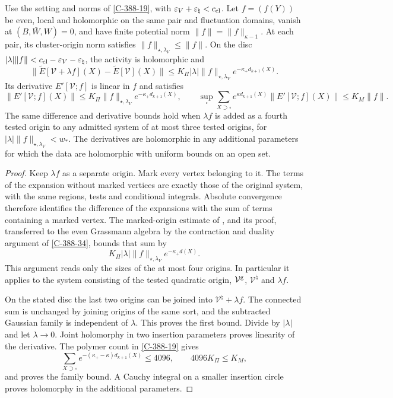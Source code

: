 \documentclass[11pt,letterpaper,reqno]{amsart}
\makeatletter
\theoremstyle{definition}
\newcommand{\ms@minorstart}{%
  \pushQED{\qed}\renewcommand{\qedsymbol}{$\blacksquare$}}
\newenvironment{lemma}[1][]{\ms@minorstart\ms@lemma[#1]}
  {\popQED\endms@lemma}
\theoremstyle{remark}
\makeatother
\begin{document}
\begin{lemma}[First variation of the expansion]\label{C-388-39}
Use the setting and norms of \cref{C-388-19}, with
$\varepsilon_V+\varepsilon_\natural<c_{\rm cl}$.
Let $f=(f(Y))$ be even, local and holomorphic on the same pair
and fluctuation domains, vanish at $(B,\bar W,W)=0$, and have
finite potential norm $\|f\|=\|f\|_{\kappa-1}$. At each pair,
its cluster-origin norm satisfies
$\|f\|_{\star,\lambda_V}\le\|f\|$. On the disc
$|\lambda|\|f\|<c_{\rm cl}-\varepsilon_V-\varepsilon_\natural$,
the activity is holomorphic and
\[
 \|\widetilde E[\mathcal V+\lambda f](X)
                   -\widetilde E[\mathcal V](X)\|
 \le K_\Pi|\lambda|\|f\|_{\star,\lambda_V}
                       e^{-\kappa_+d_{k+1}(X)}.
\]
Its derivative $E'[\mathcal V;f]$ is linear in $f$ and satisfies
\[
 \|E'[\mathcal V;f](X)\|
 \le K_\Pi\|f\|_{\star,\lambda_V}e^{-\kappa_+d_{k+1}(X)},
 \qquad
 \sup_\square\sum_{X\supset\square}e^{\kappa d_{k+1}(X)}
       \|E'[\mathcal V;f](X)\|\le K_M\|f\|.
\]
The same difference and derivative bounds hold when $\lambda f$
is added as a fourth tested origin to any admitted system of
at most three tested origins, for
$|\lambda|\|f\|_{\star,\lambda_V}<w_*$. The derivatives are
holomorphic in any additional parameters for which the data
are holomorphic with uniform bounds on an open set.
\end{lemma}
\begin{proof}
Keep $\lambda f$ as a separate origin. Mark every vertex belonging
to it. The terms of the expansion without marked vertices are
exactly those of the original system, with the same regions,
tests and conditional integrals. Absolute convergence therefore
identifies the difference of the expansions with the sum of
terms containing a marked vertex. The marked-origin estimate
of \cite[Prop.~4.17]{YMM1}, and its proof, transferred to the
even Grassmann algebra by the contraction and duality argument
of \cref{C-388-34}, bounds that sum by
\[
  K_\Pi|\lambda|\|f\|_{\star,\lambda_V}e^{-\kappa_+d(X)}.
\]
This argument reads only the sizes of the at most four origins.
In particular it applies to the system consisting of the tested
quadratic origin, $\mathcal V^{\rm g}$, $\mathcal V^\natural$
and $\lambda f$.

On the stated disc the last two origins can be joined into
$\mathcal V^\natural+\lambda f$. The connected sum is unchanged
by joining origins of the same sort, and the subtracted Gaussian
family is independent of $\lambda$. This proves the first bound.
Divide by $|\lambda|$ and let $\lambda\to0$. Joint holomorphy
in two insertion parameters proves linearity of the derivative.
The polymer count in \cref{C-388-19} gives
\[
 \sum_{X\supset\square}e^{-(\kappa_+-\kappa)d_{k+1}(X)}
 \le4096,\qquad4096K_\Pi\le K_M,
\]
and proves the family bound. A Cauchy integral on a smaller
insertion circle proves holomorphy in the additional parameters.
\end{proof}
\end{document}
